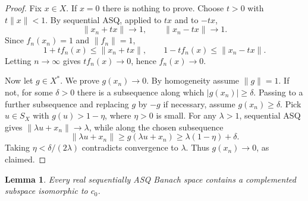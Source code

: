 \documentclass[11pt]{article}
\newtheorem{lemma}{Lemma}
\begin{document}
\begin{proof}
Fix \(x\in X\).  If \(x=0\) there is nothing to prove.  Choose
\(t>0\) with \(t\|x\|<1\).  By sequential ASQ, applied to \(t x\) and to
\(-t x\),
\[
        \|x_n+t x\|\to 1,
        \qquad
        \|x_n-t x\|\to 1.
\]
Since \(f_n(x_n)=1\) and \(\|f_n\|=1\),
\[
        1+t f_n(x) \leq \|x_n+t x\|,
        \qquad
        1-t f_n(x) \leq \|x_n-t x\|.
\]
Letting \(n\to\infty\) gives \(t f_n(x)\to 0\), hence \(f_n(x)\to 0\).

Now let \(g\in X^*\).  We prove \(g(x_n)\to0\).  By homogeneity assume
\(\|g\|=1\).  If not, for some \(\delta>0\) there is a subsequence along which
\(|g(x_n)|\geq\delta\).  Passing to a further subsequence and replacing
\(g\) by \(-g\) if necessary, assume \(g(x_n)\geq\delta\).  Pick \(u\in S_X\)
with \(g(u)>1-\eta\), where \(\eta>0\) is small.  For any \(\lambda>1\),
sequential ASQ gives \(\|\lambda u+x_n\|\to\lambda\), while along the chosen
subsequence
\[
        \|\lambda u+x_n\|
        \geq g(\lambda u+x_n)
        \geq \lambda(1-\eta)+\delta.
\]
Taking \(\eta<\delta/(2\lambda)\) contradicts convergence to \(\lambda\).
Thus \(g(x_n)\to0\), as claimed.
\end{proof}

\begin{lemma}\label{lem:complemented}
Every real sequentially ASQ Banach space contains a complemented subspace
isomorphic to \(c_0\).
\end{lemma}
\end{document}
